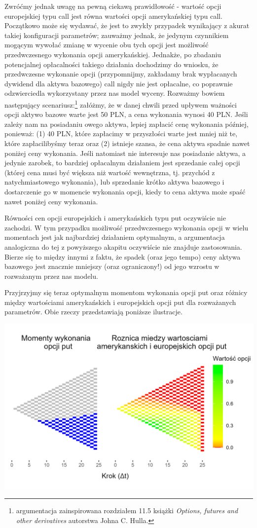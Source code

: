 \documentclass[
]{article}
\begin{document}
Zwróćmy jednak uwagę na pewną ciekawą prawidłowość - wartość opcji
europejskiej typu call jest równa wartości opcji amerykańskiej typu
call. Początkowo może się wydawać, że jest to zwykły przypadek
wynikający z akurat takiej konfiguracji parametrów; zauważmy jednak, że
jedynym czynnikiem mogącym wywołać zmianę w wycenie obu tych opcji jest
możliwość przedwczesnego wykonania opcji amerykańskiej. Jednakże, po
zbadaniu potencjalnej opłacalności takiego działania dochodzimy do
wniosku, że przedwczesne wykonanie opcji (przypomnijmy, zakładamy brak
wypłacanych dywidend dla aktywa bazowego) call nigdy nie jest opłacalne,
co poprawnie odzwierciedla wykorzystany przez nas model wyceny. Rozważmy
bowiem następujący scenariusz:\footnote{argumentacja zainspirowana
  rozdziałem 11.5 książki \emph{Options, futures and other derivatives}
  autorstwa Johna C. Hulla.} załóżmy, że w danej chwili przed upływem
ważności opcji aktywo bazowe warte jest 50 PLN, a cena wykonania wynosi
40 PLN. Jeśli zależy nam na posiadaniu owego aktywa, lepiej zapłacić
cenę wykonania później, ponieważ: (1) 40 PLN, które zapłacimy w
przyszłości warte jest mniej niż te, które zapłacilibyśmy teraz oraz (2)
istnieje szansa, że cena aktywa spadnie nawet poniżej ceny wykonania.
Jeśli natomiast nie interesuje nas posiadanie aktywa, a jedynie zarobek,
to bardziej opłacalnym działaniem jest sprzedanie całej opcji (której
cena musi być większa niż wartość wewnętrzna, tj. przychód z
natychmiastowego wykonania), lub sprzedanie krótko aktywa bazowego i
dostarczenie go w momencie wykonania opcji, kiedy to cena aktywa może
spaść nawet poniżej ceny wykonania.

Równości cen opcji europejskich i amerykańskich typu put oczywiście nie
zachodzi. W tym przypadku możliwość przedwczesnego wykonania opcji w
wielu momentach jest jak najbardziej działaniem optymalnym, a
argumentacja analogiczna do tej z powyższego akapitu oczywiście nie
znajduje zastosowania. Bierze się to między innymi z faktu, że spadek
(oraz jego tempo) ceny aktywa bazowego jest znacznie mniejszy (oraz
ograniczony!) od jego wzrostu w rozważanym przez nas modelu.

Przyjrzyjmy się teraz optymalnym momentom wykonania opcji put oraz
różnicy między wartościami amerykańskich i europejskich opcji put dla
rozważanych parametrów. Obie rzeczy przedstawiają poniższe ilustracje.

\begin{center}\includegraphics[width=0.75\linewidth,trim=0 10 0 10,clip]{wykresy/wykres} \end{center}
\end{document}
